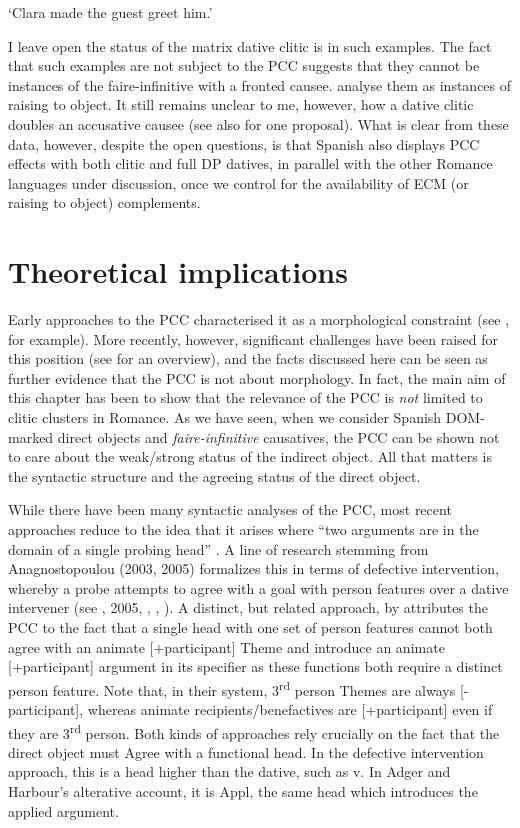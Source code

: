 \documentclass[output=paper,modfonts,nonflat]{langsci/langscibook}
\begin{document}
    ‘Clara made the guest greet him.’

I leave open the status of the matrix dative clitic is in such examples. The fact that such examples are not subject to the PCC suggests that they cannot be instances of the faire-infinitive with a fronted causee. \citet{OrmazabalRomero2013} analyse them as instances of raising to object. It still remains unclear to me, however, how a dative clitic doubles an accusative causee (see also \citealt{OrdóñezSaab2018} for one proposal). What is clear from these data, however, despite the open questions, is that Spanish also displays PCC effects with both clitic and full DP datives, in parallel with the other Romance languages under discussion, once we control for the availability of ECM (or raising to object) complements.

\section{Theoretical implications} %

Early approaches to the PCC characterised it as a morphological constraint (see \citealt{Bonet1991}, for example). More recently, however, significant challenges have been raised for this position (see \citealt{Preminger2019} for an overview), and the facts discussed here can be seen as further evidence that the PCC is not about morphology. In fact, the main aim of this chapter has been to show that the relevance of the PCC is \textit{not} limited to clitic clusters in Romance. As we have seen, when we consider Spanish DOM-marked direct objects and \textit{faire-infinitive} causatives, the PCC can be shown not to care about the weak/strong status of the indirect object. All that matters is the syntactic structure and the agreeing status of the direct object. 

While there have been many syntactic analyses of the PCC, most recent approaches reduce to the idea that it arises where “two arguments are in the domain of a single probing head” \citep[290]{Nevins2007}. A line of research stemming from Anagnostopoulou (2003, 2005) formalizes this in terms of defective intervention, whereby a probe attempts to agree with a goal with person features over a dative intervener (see \citealt{Anagnostopoulou2003}, 2005, \citealt{Nevins2007}, \citealt{Rezac2008}, \citealt{Preminger2019}). A distinct, but related approach, by \citet{AdgerHarbour2007} attributes the PCC to the fact that a single head with one set of person features cannot both agree with an animate [+participant] Theme and introduce an animate [+participant] argument in its specifier as these functions both require a distinct person feature. Note that, in their system, 3\textsuperscript{rd} person Themes are always [-participant], whereas animate recipients/benefactives are [+participant] even if they are 3\textsuperscript{rd} person.  Both kinds of approaches rely crucially on the fact that the direct object must Agree with a functional head. In the defective intervention approach, this is a head higher than the dative, such as v. In Adger and Harbour’s alterative account, it is Appl, the same head which introduces the applied argument. 
\end{document}
